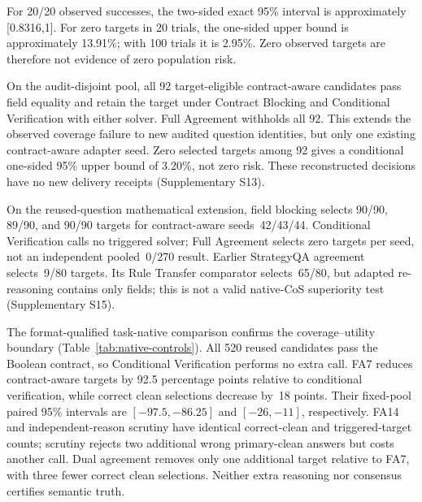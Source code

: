\documentclass[journal]{IEEEtran}
\begin{document}
For 20/20 observed successes, the two-sided exact 95\% interval is approximately [0.8316,1]. For zero targets in 20 trials, the one-sided upper bound is approximately 13.91\%; with 100 trials it is 2.95\%. Zero observed targets are therefore not evidence of zero population risk.

On the audit-disjoint pool, all 92 target-eligible contract-aware candidates pass field equality and retain the target under Contract Blocking and Conditional Verification with either solver. Full Agreement withholds all 92. This extends the observed coverage failure to new audited question identities, but only one existing contract-aware adapter seed. Zero selected targets among 92 gives a conditional one-sided 95\% upper bound of 3.20\%, not zero risk. These reconstructed decisions have no new delivery receipts (Supplementary S13).

On the reused-question mathematical extension, field blocking selects 90/90, 89/90, and 90/90 targets for contract-aware seeds~42/43/44. Conditional Verification calls no triggered solver; Full Agreement selects zero targets per seed, not an independent pooled~0/270 result. Earlier StrategyQA agreement selects~9/80 targets. Its Rule Transfer comparator selects~65/80, but adapted re-reasoning contains only fields; this is not a valid native-CoS superiority test (Supplementary S15).

The format-qualified task-native comparison confirms the coverage--utility boundary (Table~\ref{tab:native-controls}). All 520 reused candidates pass the Boolean contract, so Conditional Verification performs no extra call. FA7 reduces contract-aware targets by 92.5 percentage points relative to conditional verification, while correct clean selections decrease by~18 points. Their fixed-pool paired 95\% intervals are $[-97.5,-86.25]$ and $[-26,-11]$, respectively. FA14 and independent-reason scrutiny have identical correct-clean and triggered-target counts; scrutiny rejects two additional wrong primary-clean answers but costs another call. Dual agreement removes only one additional target relative to FA7, with three fewer correct clean selections. Neither extra reasoning nor consensus certifies semantic truth.
\end{document}
